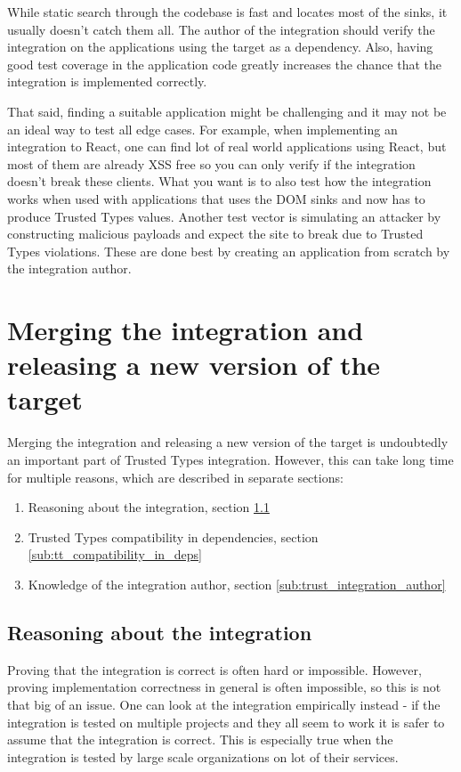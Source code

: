 While static search through the codebase is fast and locates most of the sinks, it usually doesn't
catch them all. The author of the integration should verify the integration on the applications
using the target as a dependency. Also, having good test coverage in the application code greatly
increases the chance that the integration is implemented correctly.

That said, finding a suitable application might be challenging and it may not be an ideal way to
test all edge cases. For example, when implementing an integration to React, one can find lot of
real world applications using React, but most of them are already XSS free so you can only verify if
the integration doesn't break these clients. What you want is to also test how the integration works
when used with applications that uses the DOM sinks and now has to produce Trusted Types values.
Another test vector is simulating an attacker by constructing malicious payloads and expect the site
to break due to Trusted Types violations. These are done best by creating an application from
scratch by the integration author.

\section{Merging the integration and releasing a new version of the target}

Merging the integration and releasing a new version of the target is undoubtedly an important part
of Trusted Types integration. However, this can take long time for multiple reasons, which are
described in separate sections:

\begin{enumerate}
  \item Reasoning about the integration, section \ref{sub:reason_about_integration}
  \item Trusted Types compatibility in dependencies, section \ref{sub:tt_compatibility_in_deps}
  \item Knowledge of the integration author, section \ref{sub:trust_integration_author}
\end{enumerate}

\subsection{Reasoning about the integration}
\label{sub:reason_about_integration}

Proving that the integration is correct is often hard or impossible. However, proving implementation
correctness in general is often impossible, so this is not that big of an issue. One can look at the
integration empirically instead - if the integration is tested on multiple projects and they all
seem to work it is safer to assume that the integration is correct. This is especially true when the
integration is tested by large scale organizations on lot of their services.

